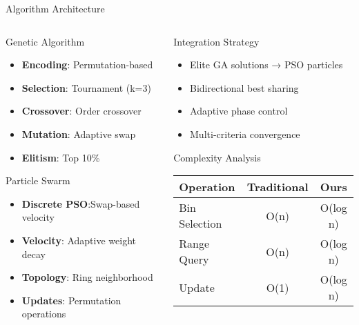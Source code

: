 \documentclass[aspectratio=169,12pt]{beamer}
\begin{document}
\begin{frame}{Algorithm Architecture}
\vspace{-0.4cm}
\begin{columns}
\begin{column}{0.5\textwidth}
\begin{block}{Genetic Algorithm}
\begin{itemize}
    \item \textbf{Encoding}: Permutation-based
    \item \textbf{Selection}: Tournament (k=3)
    \item \textbf{Crossover}: Order crossover
    \item \textbf{Mutation}: Adaptive swap
    \item \textbf{Elitism}: Top 10\%
\end{itemize}
\end{block}
\vspace{-0.15cm}
\begin{block}{Particle Swarm}
\begin{itemize}
    \item \textbf{Discrete PSO}:Swap-based velocity
    \item \textbf{Velocity}: Adaptive weight decay
    \item \textbf{Topology}: Ring neighborhood
    \item \textbf{Updates}: Permutation operations
\end{itemize}
\end{block}
\end{column}
\begin{column}{0.5\textwidth}
\vspace{0.2cm}
\begin{block}{Integration Strategy}
\begin{itemize}
    \item Elite GA solutions → PSO particles
    \item Bidirectional best sharing
    \item Adaptive phase control
    \item Multi-criteria convergence
\end{itemize}
\end{block}
\vspace{-0.15cm}
\begin{exampleblock}{Complexity Analysis}
\vspace{-0.4cm}
\begin{center}
\begin{tabular}{lcc}
\toprule
\textbf{Operation} & \textbf{Traditional} & \textbf{Ours} \\
\midrule
Bin Selection & O(n) & O(log n) \\
Range Query & O(n) & O(log n) \\
Update & O(1) & O(log n) \\

\end{tabular}
\end{center}
\end{exampleblock}
\end{column}
\end{columns}
\end{frame}
\end{document}
